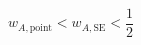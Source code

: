 \documentclass[preview]{standalone}
\begin{document}
\begin{equation}
\tag{13:bound_SE}
    {w}_{A , \mathrm{point}} < {w}_{A , \mathrm{SE}} < \frac{1}{2}
\end{equation}
\end{document}
